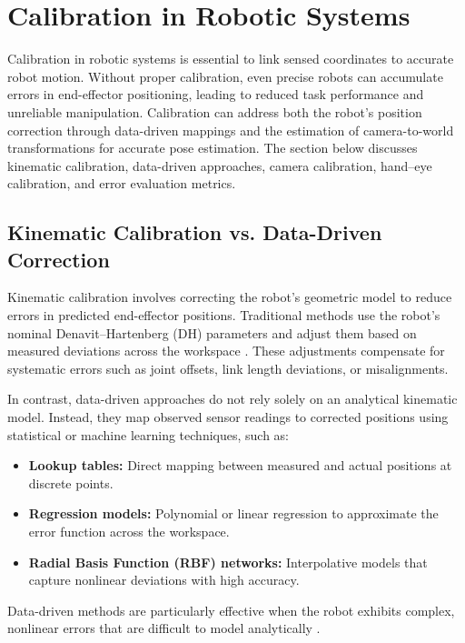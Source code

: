 \section{Calibration in Robotic Systems}

Calibration in robotic systems is essential to link sensed coordinates to accurate robot motion. Without proper calibration, even precise robots can accumulate errors in end-effector positioning, leading to reduced task performance and unreliable manipulation. Calibration can address both the robot's position correction through data-driven mappings and the estimation of camera-to-world transformations for accurate pose estimation. The section below discusses kinematic calibration, data-driven approaches, camera calibration, hand–eye calibration, and error evaluation metrics.

\subsection{Kinematic Calibration vs. Data-Driven Correction}

Kinematic calibration involves correcting the robot’s geometric model to reduce errors in predicted end-effector positions. Traditional methods use the robot’s nominal Denavit–Hartenberg (DH) parameters and adjust them based on measured deviations across the workspace \cite{Hutchinson1996}. These adjustments compensate for systematic errors such as joint offsets, link length deviations, or misalignments.  

In contrast, data-driven approaches do not rely solely on an analytical kinematic model. Instead, they map observed sensor readings to corrected positions using statistical or machine learning techniques, such as:
\begin{itemize}
    \item \textbf{Lookup tables:} Direct mapping between measured and actual positions at discrete points.
    \item \textbf{Regression models:} Polynomial or linear regression to approximate the error function across the workspace.
    \item \textbf{Radial Basis Function (RBF) networks:} Interpolative models that capture nonlinear deviations with high accuracy.
\end{itemize}

Data-driven methods are particularly effective when the robot exhibits complex, nonlinear errors that are difficult to model analytically \cite{kruger2010learning}.

